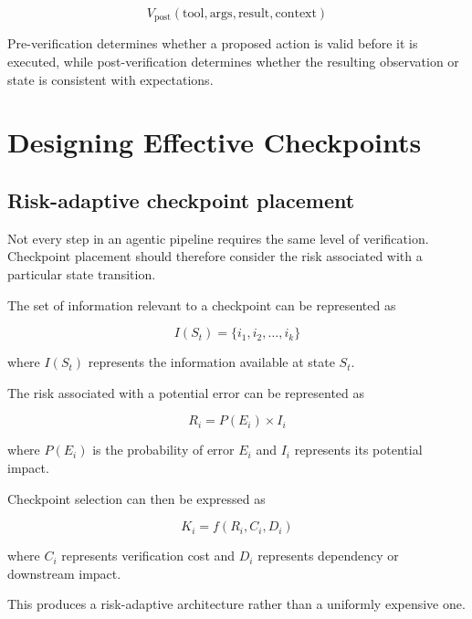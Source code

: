 \documentclass[12pt]{article}
\begin{document}
\begin{equation}
V_{\mathrm{post}}(\text{tool},\text{args},\text{result},\text{context})
\label{eq:post-verification}
\end{equation}

Pre-verification determines whether a proposed action is valid before it is
executed, while post-verification determines whether the resulting observation
or state is consistent with expectations.

\section{Designing Effective Checkpoints}
\label{sec:checkpoint-design}

\subsection{Risk-adaptive checkpoint placement}
\label{sec:risk-adaptive}

Not every step in an agentic pipeline requires the same level of verification.
Checkpoint placement should therefore consider the risk associated with a
particular state transition.

The set of information relevant to a checkpoint can be represented as

\begin{equation}
I(S_t)=\{i_1,i_2,\ldots,i_k\}
\label{eq:checkpoint-information}
\end{equation}

where $I(S_t)$ represents the information available at state $S_t$.

The risk associated with a potential error can be represented as

\begin{equation}
R_i=P(E_i)\times I_i
\label{eq:error-risk}
\end{equation}

where $P(E_i)$ is the probability of error $E_i$ and $I_i$ represents its
potential impact.

Checkpoint selection can then be expressed as

\begin{equation}
K_i=f(R_i,C_i,D_i)
\label{eq:checkpoint-selection}
\end{equation}

where $C_i$ represents verification cost and $D_i$ represents dependency or
downstream impact.

This produces a risk-adaptive architecture rather than a uniformly expensive one.
\end{document}
